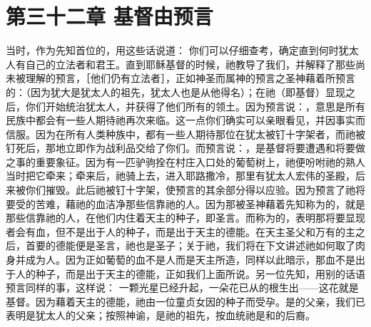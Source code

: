 
\section{第三十二章 基督由预言}

当时，作为先知首位的，用这些话说道： 你们可以仔细查考，确定直到何时犹太人有自己的立法者和君王。直到耶稣基督的时候，祂教导了我们，并解释了那些尚未被理解的预言，［他们仍有立法者］，正如神圣而属神的预言之圣神藉着所预言的：（因为犹大是犹太人的祖先，犹太人也是从他得名）；在祂（即基督）显现之后，你们开始统治犹太人，并获得了他们所有的领土。因为预言说：，意思是所有民族中都会有一些人期待祂再次来临。这一点你们确实可以亲眼看见，并因事实而信服。因为在所有人类种族中，都有一些人期待那位在犹太被钉十字架者，而祂被钉死后，那地立即作为战利品交给了你们。而预言说：，是基督将要遭遇和将要做之事的重要象征。因为有一匹驴驹拴在村庄入口处的葡萄树上，祂便吩咐祂的熟人当时把它牵来；牵来后，祂骑上去，进入耶路撒冷，那里有犹太人宏伟的圣殿，后来被你们摧毁。此后祂被钉十字架，使预言的其余部分得以应验。因为预言了祂将要受的苦难，藉祂的血洁净那些信靠祂的人。因为那被圣神藉着先知称为的，就是那些信靠祂的人，在他们内住着天主的种子，即圣言。而称为的，表明那将要显现者会有血，但不是出于人的种子，而是出于天主的德能。在天主圣父和万有的主之后，首要的德能便是圣言，祂也是圣子；关于祂，我们将在下文讲述祂如何取了肉身并成为人。因为正如葡萄的血不是人而是天主所造，同样以此暗示，那血不是出于人的种子，而是出于天主的德能，正如我们上面所说。另一位先知，用别的话语预言同样的事，这样说： 一颗光星已经升起，一朵花已从的根生出——这花就是基督。因为藉着天主的德能，祂由一位童贞女因的种子而受孕。是的父亲，我们已表明是犹太人的父亲；按照神谕，是祂的祖先，按血统祂是和的后裔。\par



